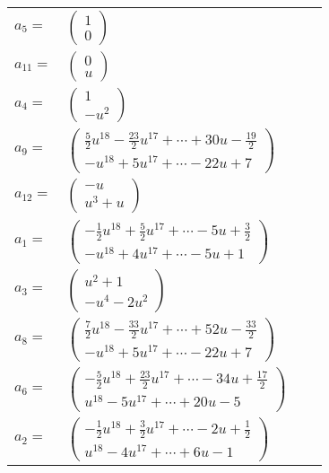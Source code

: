 \documentclass[1p]{elsarticle_modified}
\theoremstyle{definition}
\begin{document}
\begin{tabular}{m{7pt} m{180pt} m{7pt} m{180pt} }
\flushright $a_{5}=$&$\begin{pmatrix}1\\0\end{pmatrix}$ \\
\flushright $a_{11}=$&$\begin{pmatrix}0\\u\end{pmatrix}$ \\
\flushright $a_{4}=$&$\begin{pmatrix}1\\- u^2\end{pmatrix}$ \\
\flushright $a_{9}=$&$\begin{pmatrix}\frac{5}{2} u^{18}-\frac{23}{2} u^{17}+\cdots+30 u-\frac{19}{2}\\- u^{18}+5 u^{17}+\cdots-22 u+7\end{pmatrix}$ \\
\flushright $a_{12}=$&$\begin{pmatrix}- u\\u^3+u\end{pmatrix}$ \\
\flushright $a_{1}=$&$\begin{pmatrix}-\frac{1}{2} u^{18}+\frac{5}{2} u^{17}+\cdots-5 u+\frac{3}{2}\\- u^{18}+4 u^{17}+\cdots-5 u+1\end{pmatrix}$ \\
\flushright $a_{3}=$&$\begin{pmatrix}u^2+1\\- u^4-2 u^2\end{pmatrix}$ \\
\flushright $a_{8}=$&$\begin{pmatrix}\frac{7}{2} u^{18}-\frac{33}{2} u^{17}+\cdots+52 u-\frac{33}{2}\\- u^{18}+5 u^{17}+\cdots-22 u+7\end{pmatrix}$ \\
\flushright $a_{6}=$&$\begin{pmatrix}-\frac{5}{2} u^{18}+\frac{23}{2} u^{17}+\cdots-34 u+\frac{17}{2}\\u^{18}-5 u^{17}+\cdots+20 u-5\end{pmatrix}$ \\
\flushright $a_{2}=$&$\begin{pmatrix}-\frac{1}{2} u^{18}+\frac{3}{2} u^{17}+\cdots-2 u+\frac{1}{2}\\u^{18}-4 u^{17}+\cdots+6 u-1\end{pmatrix}$ \\

\end{tabular}
\end{document}
